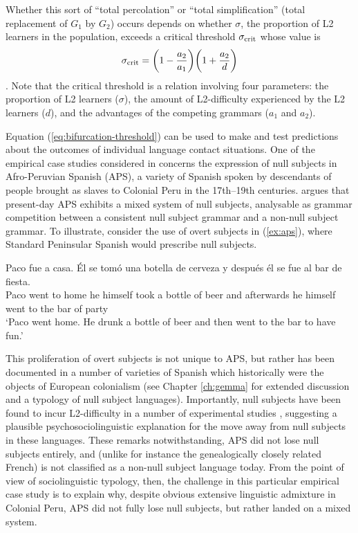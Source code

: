 Whether this sort of ``total percolation'' or ``total simplification''
(total replacement of \(G_1\) by \(G_2\)) occurs depends on whether
\(\sigma\), the proportion of L2 learners in the population, exceeds a
critical threshold \(\sigma_\textnormal{crit}\) whose value is
\begin{equation}
\sigma_\textnormal{crit} = \bigg(1 - \frac{a_2}{a_1}\bigg)\bigg(1 + \frac{a_2}{d}\bigg)
\label{eq:bifurcation-threshold}\end{equation} \autocite[equation
19]{Kauhanen2022}. Note that the critical threshold is a relation
involving four parameters: the proportion of L2 learners (\(\sigma\)),
the amount of L2-difficulty experienced by the L2 learners (\(d\)), and
the advantages of the competing grammars (\(a_1\) and \(a_2\)).

Equation (\ref{eq:bifurcation-threshold}) can be used to make and test
predictions about the outcomes of individual language contact
situations. One of the empirical case studies considered in
\textcite{Kauhanen2022} concerns the expression of null subjects in
Afro-Peruvian Spanish (APS), a variety of Spanish spoken by descendants
of people brought as slaves to Colonial Peru in the 17th--19th
centuries. \textcite{SessaregoBook} argues that present-day APS exhibits
a mixed system of null subjects, analysable as grammar competition
between a consistent null subject grammar and a non-null subject
grammar. To illustrate, consider the use of overt subjects in
(\ref{ex:aps}), where Standard Peninsular Spanish would prescribe null
subjects.

\begin{exe}
\ex \label{ex:aps} 
\gll Paco fue a casa. Él se tomó una botella de cerveza y después él se fue al bar de fiesta. \\ 
Paco went to home he himself took a bottle of beer and afterwards he himself went {to the} bar of party \\
\trans `Paco went home. He drunk a bottle of beer and then went to the bar to have fun.' \hfill \parencite[382]{Ses2014}
\end{exe}

\noindent This proliferation of overt subjects is not unique to APS, but
rather has been documented in a number of varieties of Spanish which
historically were the objects of European colonialism (see Chapter
\ref{ch:gemma} for extended discussion and a typology of null subject
languages). Importantly, null subjects have been found to incur
L2-difficulty in a number of experimental studies
\autocite{Bini1993,PerGla1999,MargazaBel2006}, suggesting a plausible
psychosociolinguistic explanation for the move away from null subjects
in these languages. These remarks notwithstanding, APS did not lose null
subjects entirely, and (unlike for instance the genealogically closely
related French) is not classified as a non-null subject language today.
From the point of view of sociolinguistic typology, then, the challenge
in this particular empirical case study is to explain why, despite
obvious extensive linguistic admixture in Colonial Peru, APS did not
fully lose null subjects, but rather landed on a mixed system.

